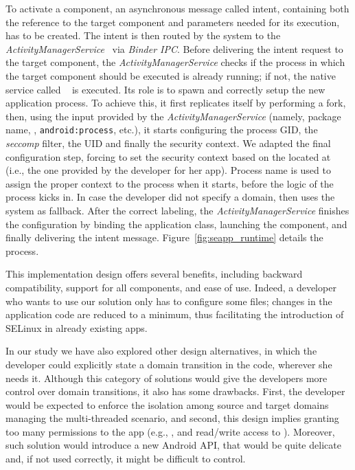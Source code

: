 To activate a component, an asynchronous message called intent,
containing both the reference to the target component and parameters
needed for its execution, has to be created.  The intent is then
routed by the system to the {\em
  ActivityManagerService}~\cite{seapp_activitymanserv} via {\em Binder
  IPC}.  Before delivering the intent request to the target component,
the {\em ActivityManagerService} checks if the process in which the
target component should be executed is already running; if not, the
native service called \zygote~\cite{seapp_zygoterfi} is executed.  Its
role is to spawn and correctly setup the new application process.  To
achieve this, it first replicates itself by performing a fork, then,
using the input provided by the {\em ActivityManagerService} (namely,
package name, \seinfo, {\tt android:process}, etc.), it starts
configuring the process GID, the {\em seccomp} filter, the UID and
finally the \sel security context.  We adapted the final configuration
step, forcing \zygote to set the security context based on the
\seappcontexts located at {\tt \dataselinuxdir} (i.e., the one
provided by the developer for her app).  Process name is used to
assign the proper context to the process when it starts, before the
logic of the process kicks in.  In case the developer did not specify
a domain, then \zygote uses the system \seappcontexts as fallback.
After the correct labeling, the {\em ActivityManagerService} finishes
the configuration by binding the application class, launching the
component, and finally delivering the intent message.
Figure~\ref{fig:seapp_runtime} details the process.

This implementation design offers several benefits, including backward
compatibility, support for all components, and ease of use.
Indeed, a developer who wants to use our solution only has to
configure some files; changes in the application code are reduced to a
minimum, thus facilitating the introduction of SELinux in already
existing apps.

In our study we have also explored other design alternatives, in which
the developer could explicitly state a domain transition in the code,
wherever she needs it.  Although this category of solutions would give
the developers more control over domain transitions, it also has some
drawbacks.  First, the developer would be expected to enforce the
isolation among source and target domains managing the multi-threaded
scenario, and second, this design implies granting too many
permissions to the app (e.g., \dyntransition, \setcurrent and
read/write access to \selinuxfs).  Moreover, such solution would
introduce a new Android API, that would be quite delicate and, if not
used correctly, it might be difficult to control.

